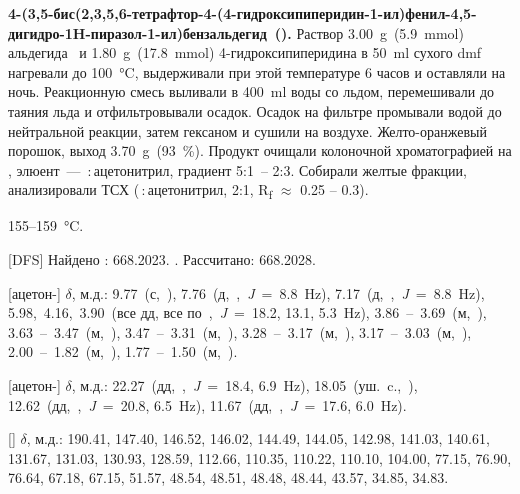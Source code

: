 \textbf{4-(3,5-бис(2,3,5,6-тетрафтор-4-(4-гидроксипиперидин-1-ил)фенил-4,5-дигидро-1H-пиразол-1-ил)бензальдегид~().} Раствор \SI{3.00}{\gram}~(\SI{5.9}{\mmol}) альдегида~\textbf{} и \SI{1.80}{\gram}~(\SI{17.8}{\mmol}) 4-гидроксипиперидина в \SI{50}{\milli\litre} сухого \ac{dmf} нагревали до \SI{100}{\celsius}, выдерживали при этой температуре 6 часов и оставляли на ночь. Реакционную смесь выливали в \SI{400}{\milli\litre} воды со льдом, перемешивали до таяния льда и отфильтровывали осадок. Осадок на фильтре промывали водой до нейтральной реакции, затем гексаном и сушили на воздухе. Желто-оранжевый порошок, выход \SI{3.70}{\gram}~(\SI{93}{\percent}). Продукт очищали колоночной хроматографией на , элюент~--- \,:\,ацетонитрил, градиент 5:1~-- 2:3. Собирали желтые фракции, анализировали ТСХ (\,:\,ацетонитрил, 2:1, R\textsubscript{f} $\approx$ 0.25 -- 0.3).
\begin{experimental}[format=\bfseries]
     155--\SI{159}{\celsius}.

    [DFS] Найдено \ce{[M+]}: \num{668.2023}. . Рассчитано:  \num{668.2028}.

    [ацетон-] $\delta$, м.д.: 9.77~(с,~), 7.76~(д,~,~\textit{J}~=~8.8~\si{\hertz}), 7.17~(д,~,~\textit{J}~=~8.8~\si{\hertz}), 5.98,~4.16,~3.90~(все дд, все по~,~\textit{J}~=~18.2, 13.1, 5.3~\si{\hertz}), 3.86~--~3.69~(м,~), 3.63~--~3.47~(м,~), 3.47~--~3.31~(м,~), 3.28~--~3.17~(м,~), 3.17~--~3.03~(м,~), 2.00~--~1.82~(м,~), 1.77~--~1.50~(м,~).

    [ацетон-] $\delta$, м.д.: 22.27~(дд,~,~\textit{J}~=~18.4, 6.9~\si{\hertz}), 18.05~(уш.~c.,~), 12.62~(дд,~,~\textit{J}~=~20.8, 6.5~\si{\hertz}), 11.67~(дд,~,~\textit{J}~=~17.6, 6.0~\si{\hertz}).

    [] $\delta$, м.д.: 190.41, 147.40, 146.52, 146.02, 144.49, 144.05, 142.98, 141.03, 140.61, 131.67, 131.03, 130.93, 128.59, 112.66, 110.35, 110.22, 110.10, 104.00, 77.15, 76.90, 76.64, 67.18, 67.15, 51.57, 48.54, 48.51, 48.48, 48.44, 43.57, 34.85, 34.83.
\end{experimental}

